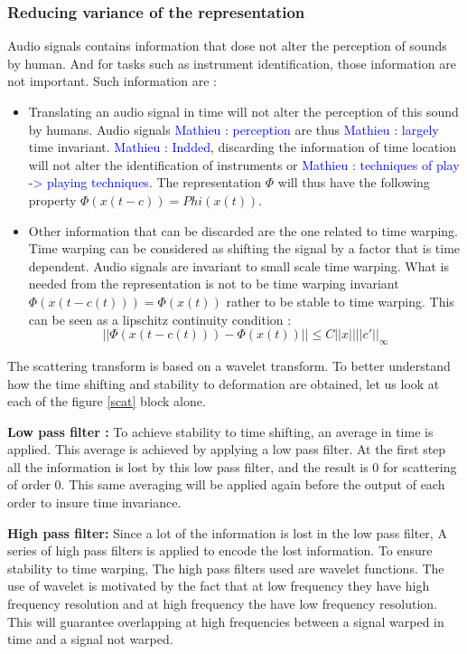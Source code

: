 \documentclass[hidelinks,12pt]{report}
\newcommand{\ml}[1]{\textcolor{blue}{ Mathieu : #1}}
\begin{document}
\subsubsection{Reducing variance of the representation}
Audio signals contains information that dose not alter the perception of sounds by human. And for tasks such as instrument identification, those information are not important. Such information are : 
\begin{itemize}
\item Translating an audio signal in time will not alter the perception of this sound by humans. Audio signals \ml{perception} are thus \ml{largely} time invariant. \ml{Indded}, discarding the information of time location will not alter the identification of instruments or \ml{techniques of play -> playing techniques}. The representation $\Phi$ will thus have the following property $\Phi(x(t-c))=Phi(x(t))$.
\item Other information that can be discarded are the one related to time warping. Time warping can be considered as shifting the signal by a factor that is time dependent. Audio signals are invariant to small scale time warping. What is needed from the representation is not to be time warping invariant $\Phi (x(t-c(t)))=\Phi(x(t))$ rather to be stable to time warping. This can be seen as a lipschitz continuity condition : $$||\Phi (x(t-c(t)))-\Phi(x(t))|| \leq C||x||||c'||_{\infty}$$
\end{itemize}
The scattering transform is based on a wavelet transform. To better understand how the time shifting and stability to deformation are obtained, let us look at each of the figure \ref{scat} block alone.\par
\textbf{Low pass filter :}
To achieve stability to time shifting, an average in time is applied. This average is achieved by applying a low pass filter. At the first step all the information is lost by this low pass filter, and the result is 0 for scattering of order 0. This same averaging will be applied again before the output of each order to insure time invariance.\par
\textbf{High pass filter:}
Since a lot of the information is lost in the low pass filter, A series of high pass filters is applied to encode the lost information. To ensure stability to time warping, The high pass filters used are wavelet functions. The use of wavelet is motivated by the fact that at low frequency they have high frequency resolution and at high frequency the have low frequency resolution. This will guarantee overlapping at high frequencies between a signal warped in time and a signal not warped.\par
\end{document}
